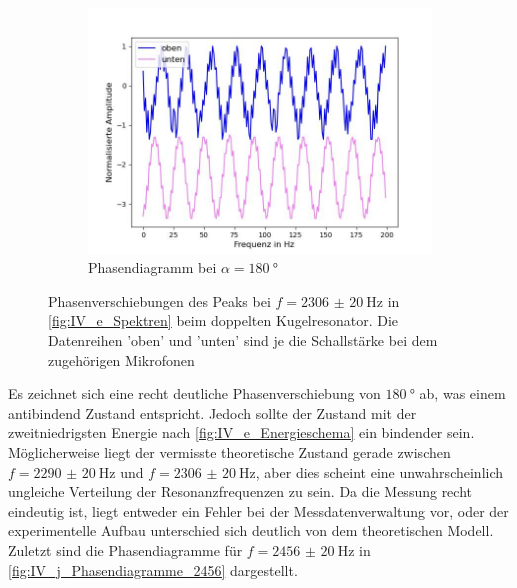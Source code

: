 \documentclass[../main.tex]{subfiles}
\begin{document}
\begin{figure}[H]
\begin{subfigure}[b]{0.45\textwidth}
            \end{subfigure}
            \begin{subfigure}[b]{0.45\textwidth}
                \centering
                \includegraphics[width=\textwidth]{Bilddateien/Auswertung/IV_j_Phasen2306_180Grad.jpg}
                \caption{Phasendiagramm bei $\alpha=\SI{180}{\degree}$}
                \label{fig:IV_j_Phasen2306_180Grad}
            \end{subfigure}
            \caption{Phasenverschiebungen des Peaks bei $f=\SI{2306(20)}{\hertz}$ in \ref{fig:IV_e_Spektren} beim doppelten Kugelresonator. Die Datenreihen 'oben' und 'unten' sind je die Schallstärke bei dem zugehörigen Mikrofonen}
            \label{fig:IV_j_Phasendiagramme_2306}
        \end{figure}

        Es zeichnet sich eine recht deutliche Phasenverschiebung von $\SI{180}{\degree}$ ab, was einem antibindend Zustand entspricht. Jedoch sollte der Zustand mit der zweitniedrigsten Energie nach \ref{fig:IV_e_Energieschema} ein bindender sein. Möglicherweise liegt der vermisste theoretische Zustand gerade zwischen $f=\SI{2290(20)}{\hertz}$ und $f=\SI{2306(20)}{\hertz}$, aber dies scheint eine unwahrscheinlich ungleiche Verteilung der Resonanzfrequenzen zu sein. Da die Messung recht eindeutig ist, liegt entweder ein Fehler bei der Messdatenverwaltung vor, oder der experimentelle Aufbau unterschied sich deutlich von dem theoretischen Modell.\\

        Zuletzt sind die Phasendiagramme für $f=\SI{2456(20)}{\hertz}$ in \ref{fig:IV_j_Phasendiagramme_2456} dargestellt.
\end{document}
